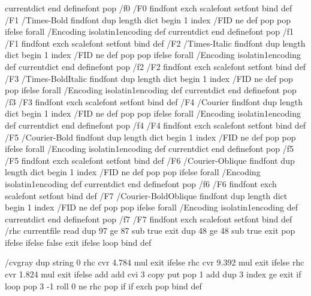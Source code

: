     currentdict end
definefont pop
/f0 { /F0 findfont exch scalefont setfont } bind def
/F1
    /Times-Bold findfont
    dup length dict begin
	{1 index /FID ne {def} {pop pop} ifelse} forall
	/Encoding isolatin1encoding def
    currentdict end
definefont pop
/f1 { /F1 findfont exch scalefont setfont } bind def
/F2
    /Times-Italic findfont
    dup length dict begin
	{1 index /FID ne {def} {pop pop} ifelse} forall
	/Encoding isolatin1encoding def
    currentdict end
definefont pop
/f2 { /F2 findfont exch scalefont setfont } bind def
/F3
    /Times-BoldItalic findfont
    dup length dict begin
	{1 index /FID ne {def} {pop pop} ifelse} forall
	/Encoding isolatin1encoding def
    currentdict end
definefont pop
/f3 { /F3 findfont exch scalefont setfont } bind def
/F4
    /Courier findfont
    dup length dict begin
	{1 index /FID ne {def} {pop pop} ifelse} forall
	/Encoding isolatin1encoding def
    currentdict end
definefont pop
/f4 { /F4 findfont exch scalefont setfont } bind def
/F5
    /Courier-Bold findfont
    dup length dict begin
	{1 index /FID ne {def} {pop pop} ifelse} forall
	/Encoding isolatin1encoding def
    currentdict end
definefont pop
/f5 { /F5 findfont exch scalefont setfont } bind def
/F6
    /Courier-Oblique findfont
    dup length dict begin
	{1 index /FID ne {def} {pop pop} ifelse} forall
	/Encoding isolatin1encoding def
    currentdict end
definefont pop
/f6 { /F6 findfont exch scalefont setfont } bind def
/F7
    /Courier-BoldOblique findfont
    dup length dict begin
	{1 index /FID ne {def} {pop pop} ifelse} forall
	/Encoding isolatin1encoding def
    currentdict end
definefont pop
/f7 { /F7 findfont exch scalefont setfont } bind def
/rhc {
    {
        currentfile read {
	    dup 97 ge
		{ 87 sub true exit }
		{ dup 48 ge { 48 sub true exit } { pop } ifelse }
	    ifelse
	} {
	    false
	    exit
	} ifelse
    } loop
} bind def

/cvgray { %
    dup string
    0
    {
	rhc { cvr 4.784 mul } { exit } ifelse
	rhc { cvr 9.392 mul } { exit } ifelse
	rhc { cvr 1.824 mul } { exit } ifelse
	add add cvi 3 copy put pop
	1 add
	dup 3 index ge { exit } if
    } loop
    pop
    3 -1 roll 0 ne { rhc { pop } if } if
    exch pop
} bind def


